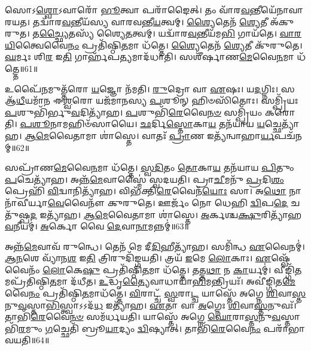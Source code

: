 𑌸𑍋𑌽\-\ul{𑌶𑍍𑌵𑍋}\-\-𑌽𑌵𑌾𑌰𑍋᳴ \ul{𑌭𑍂}\-𑌤𑍍𑌵𑌾 𑌪𑌰𑌾᳴𑌙𑍈𑌤𑍍।
𑌤𑌂 𑌵𑌾᳴𑌰\-\ul{𑌵}\-𑌨𑍍𑌤𑍀𑌯𑍇᳴𑌨𑌾𑌵𑌾𑌰𑌯𑌤।
𑌤𑌦𑍍𑌵𑌾᳴𑌰\-\ul{𑌵}\-𑌨𑍍𑌤𑍀𑌯᳴𑌸𑍍𑌯 𑌵𑌾𑌰𑌵𑌨𑍍𑌤𑍀\-\ul{𑌯}\-𑌤𑍍𑌵𑌮𑍍।
\-\ul{𑌶𑍍𑌯𑍈}\-𑌤𑍇𑌨᳴ \ul{𑌶𑍍𑌯𑍇}\-𑌤𑍀 𑌅᳴𑌕𑍁𑌰𑍁𑌤।
𑌤\-\ul{𑌚𑍍𑌛𑍍𑌯𑍈}\-𑌤𑌸𑍍𑌯᳴ 𑌶𑍍𑌯𑍈\-\ul{𑌤}\-𑌤𑍍𑌵𑌮𑍍।
𑌯𑌦𑍍𑌵𑌾᳴𑌰\-\ul{𑌵}\-𑌨𑍍𑌤𑍀𑌯᳴𑌮\-\ul{𑌭𑌿} 𑌗𑌾𑌯᳴𑌤𑍇।
\-\ul{𑌵𑌾}\-\-\ul{𑌰}\-\-\ul{𑌯𑌿}\-𑌤𑍍𑌵𑍈𑌵𑍈\-\ul{𑌨𑌂} 𑌪𑍍𑌰𑌤𑌿᳴\-𑌷𑍍𑌠𑌿\-\ul{𑌤}\-𑌮𑌾 𑌧᳴𑌤𑍍𑌤𑍇।
\-\ul{𑌶𑍍𑌯𑍈}\-𑌤𑍇𑌨᳴ \ul{𑌶𑍍𑌯𑍇}\-𑌤𑍀 𑌕𑍁᳴𑌰𑍁𑌤𑍇।
\-\ul{𑌘}\-𑌰𑍍𑌮𑌃 𑌶𑌿\-\ul{𑌰} 𑌇\-\ul{𑌤𑌿} 𑌗𑌾𑌰𑍍\mbox{}𑌹᳴𑌪\-\ul{𑌤𑍍𑌯}\-𑌮𑌾𑌦᳴𑌧𑌾𑌤𑌿।
𑌸𑌶𑍀᳴𑌰𑍍\mbox{}𑌷𑌾𑌣\-\ul{𑌮𑍇}\-𑌵𑍈\-\ul{𑌨}\-𑌮𑌾 𑌧᳴𑌤𑍍𑌤𑍇॥61॥

𑌉𑌪𑍈᳴\-\ul{𑌨}\-𑌮𑍁𑌤𑍍𑌤᳴𑌰𑍋 \ul{𑌯}\-𑌜𑍍𑌞𑍋 𑌨᳴𑌮𑌤𑌿।
\-\ul{𑌰𑍁}\-𑌦𑍍𑌰𑍋 𑌵𑌾 \ul{𑌏}\-𑌷𑌃।
𑌯\-\ul{𑌦}\-𑌗𑍍𑌨𑌿𑌃।
𑌸 𑌆᳴\-\ul{𑌧𑍀}\-𑌯𑌮𑌾᳴𑌨 𑌈\-\ul{𑌶𑍍𑌵}\-𑌰𑍋 𑌯𑌜᳴𑌮𑌾𑌨𑌸𑍍𑌯 \ul{𑌪}\-𑌶𑍂𑌨𑍍 𑌹𑌿𑍞𑌸𑌿᳴𑌤𑍋𑌃।
𑌸𑌮𑍍𑌪𑍍𑌰𑌿᳴𑌯𑌃 \ul{𑌪}\-𑌶𑍁𑌭𑌿᳴𑌰𑍍𑌭𑍁\-\ul{𑌵}\-𑌦𑌿𑌤𑍍𑌯𑌾᳴𑌹।
\-\ul{𑌪}\-𑌶𑍁𑌭𑌿᳴\-\ul{𑌰𑍇}\-𑌵𑍈\-\ul{𑌨}\-\-\ul{𑍞} 𑌸𑌮𑍍𑌪𑍍𑌰𑌿᳴𑌯𑌂 𑌕𑌰𑍋𑌤𑌿।
\-\ul{𑌪}\-\-\ul{𑌶𑍂}\-𑌨𑌾𑌮𑌹𑌿𑍞᳴𑌸𑌾𑌯𑍈।
\-\ul{𑌛}\-𑌰𑍍𑌦𑌿\-\ul{𑌸𑍍𑌤𑍋}\-𑌕𑌾\-\ul{𑌯} 𑌤𑌨᳴𑌯𑌾𑌯 \ul{𑌯}\-𑌚𑍍𑌛𑍇𑌤𑍍𑌯𑌾᳴𑌹।
\-\ul{𑌆}\-\-\-\ul{𑌮𑍇}\-𑌵𑍈𑌤𑌾𑌮𑌾 𑌶𑌾॑𑌸𑍍𑌤𑍇।
𑌵𑌾𑌤𑌃᳴ \ul{𑌪𑍍𑌰𑌾}\-𑌣 𑌇𑌤𑍍𑌯᳴𑌨𑍍𑌵𑌾𑌹𑌾\-\ul{𑌰𑍍𑌯}\-𑌪𑌚᳴𑌨𑌮𑍍॥62॥

𑌸𑌪𑍍𑌰𑌾᳴𑌣\-\ul{𑌮𑍇}\-𑌵𑍈\-\ul{𑌨}\-𑌮𑌾 𑌧᳴𑌤𑍍𑌤𑍇।
\-\ul{𑌸𑍍𑌵}\-\-\ul{𑌦𑌿}\-𑌤𑌂 \ul{𑌤𑍋}\-𑌕𑌾\-\ul{𑌯} 𑌤𑌨᳴𑌯𑌾𑌯 \ul{𑌪𑌿}\-𑌤𑍁𑌂 \ul{𑌪}\-𑌚𑍇𑌤𑍍𑌯𑌾᳴𑌹।
𑌅𑌨𑍍𑌨᳴\-\ul{𑌮𑍇}\-𑌵𑌾𑌸𑍍𑌮𑍈॑ 𑌸𑍍𑌵𑌦𑌯𑌤𑌿।
𑌪𑍍𑌰𑌾\-\ul{𑌚𑍀}\-𑌮𑌨𑍁᳴ \ul{𑌪𑍍𑌰}\-𑌦𑌿\-\ul{𑌶𑌂} 𑌪𑍍𑌰𑍇𑌹𑌿᳴ \ul{𑌵𑌿}\-𑌦𑍍𑌵𑌾𑌨𑌿𑌤𑍍𑌯𑌾᳴𑌹।
𑌵𑌿𑌭᳴𑌕𑍍𑌤𑌿\-\ul{𑌰𑍇}\-𑌵𑍈𑌨᳴\-\ul{𑌯𑍋𑌃} 𑌸𑌾।
𑌅\-\ul{𑌥𑍋} 𑌨𑌾𑌨𑌾᳴𑌵𑍀𑌰𑍍𑌯𑌾\-\ul{𑌵𑍇}\-𑌵𑍈𑌨𑍗᳴ 𑌕𑍁𑌰𑍁𑌤𑍇।
𑌊𑌰𑍍𑌜𑌂᳴ 𑌨𑍋 𑌧𑍇𑌹𑌿 \ul{𑌦𑍍𑌵𑌿}\-𑌪\-\ul{𑌦𑍇} 𑌚𑌤𑍁᳴𑌷𑍍𑌪\-\ul{𑌦} 𑌇𑌤𑍍𑌯𑌾᳴𑌹।
\-\ul{𑌆}\-\-\-\ul{𑌮𑍇}\-𑌵𑍈𑌤𑌾𑌮𑌾 𑌶𑌾॑𑌸𑍍𑌤𑍇।
\-\ul{𑌅}\-𑌰𑍍𑌕𑌶𑍍𑌚\-\ul{𑌕𑍍𑌷𑍁}\-𑌰𑌿𑌤𑍍𑌯𑌾᳴𑌹\-\ul{𑌵}\-𑌨𑍀𑌯𑌮𑍍॑।
\-\ul{𑌅}\-𑌰𑍍𑌕𑍋 𑌵𑍈 \ul{𑌦𑍇}\-𑌵𑌾\-\ul{𑌨𑌾}\-𑌮𑌨𑍍𑌨𑌮𑍍॑॥63॥

𑌅𑌨𑍍𑌨᳴\-\ul{𑌮𑍇}\-𑌵𑌾𑌵᳴ 𑌰𑍁𑌨𑍍𑌧𑍇।
𑌤𑍇𑌨᳴ 𑌮𑍇 𑌦𑍀\-\ul{𑌦𑌿}\-𑌹𑍀𑌤𑍍𑌯𑌾᳴𑌹।
𑌸𑌮𑌿᳴𑌨𑍍𑌧 \ul{𑌏}\-𑌵𑍈𑌨𑌮𑍍॑।
\-\ul{𑌆}\-\-\ul{𑌨}\-𑌶𑍇 𑌵𑍍𑌯𑌾᳴𑌨\-\ul{𑌶} 𑌇\-\ul{𑌤𑌿} 𑌤𑍍𑌰𑌿𑌰𑍁𑌦𑌿᳴𑌙𑍍𑌗𑌯𑌤𑌿।
𑌤𑍍𑌰𑌯᳴ \ul{𑌇}\-𑌮𑍇 \ul{𑌲𑍋}\-𑌕𑌾𑌃।
\-\ul{𑌏}\-𑌷𑍍𑌵𑍇᳴𑌵𑍈𑌨𑌂᳴ \ul{𑌲𑍋}\-𑌕𑍇\-\ul{𑌷𑍁} 𑌪𑍍𑌰𑌤𑌿᳴\-𑌷𑍍𑌠𑌿\-\ul{𑌤}\-𑌮𑌾 𑌧᳴𑌤𑍍𑌤𑍇।
𑌤𑌤𑍍𑌤\-\ul{𑌥𑌾} 𑌨 \ul{𑌕𑌾}\-𑌰𑍍𑌯𑌮𑍍॑।
𑌵𑍀𑌙𑍍𑌗𑌿᳴\-\ul{𑌤}\-𑌮𑌪𑍍𑌰᳴𑌤𑌿𑌷𑍍𑌠𑌿\-\ul{𑌤}\-𑌮𑌾 𑌦᳴𑌧𑍀𑌤।
\-\ul{𑌉}\-𑌦𑍍𑌧𑍃\-\ul{𑌤𑍍𑌯𑍈}\-𑌵𑌾𑌧𑌾𑌯𑌾᳴\-\ul{𑌭𑌿}\-𑌮𑌨𑍍𑌤𑍍𑌰𑌿𑌯𑌃᳴।
𑌅𑌵𑍀॑𑌙𑍍𑌗𑌿𑌤\-\ul{𑌮𑍇}\-𑌵𑍈\-\ul{𑌨𑌂} 𑌪𑍍𑌰𑌤𑌿᳴\-𑌷𑍍𑌠𑌿\-\ul{𑌤}\-𑌮𑌾𑌧᳴𑌤𑍍𑌤𑍇।
\-\ul{𑌵𑌿}\-𑌰𑌾𑌟𑍍𑌚᳴ \ul{𑌸𑍍𑌵}\-𑌰𑌾\-\ul{𑌟𑍍𑌚} 𑌯𑌾𑌸𑍍𑌤𑍇᳴ 𑌅𑌗𑍍𑌨𑍇 \ul{𑌶𑌿}\-𑌵𑌾\-\ul{𑌸𑍍𑌤}\-𑌨𑍁\-\ul{𑌵}\-𑌸𑍍𑌤𑌾\-\ul{𑌭𑌿}\-𑌸𑍍𑌤𑍍𑌵𑌾\-𑌽𑌽𑌦᳴\-\ul{𑌧} 𑌇𑌤𑍍𑌯𑌾᳴𑌹।
\-\ul{𑌏}\-𑌤𑌾 𑌵𑌾 \ul{𑌅}\-𑌗𑍍𑌨𑍇𑌃 \ul{𑌶𑌿}\-𑌵𑌾\-\ul{𑌸𑍍𑌤}\-𑌨𑍁𑌵𑌃᳴।
𑌤𑌾𑌭𑌿᳴\-\ul{𑌰𑍇}\-𑌵𑍈\-\ul{𑌨}\-\-\ul{𑍞} 𑌸𑌮᳴𑌰𑍍𑌧𑌯𑌤𑌿।
𑌯𑌾𑌸𑍍𑌤𑍇᳴ 𑌅𑌗𑍍𑌨𑍇 \ul{𑌘𑍋}\-𑌰𑌾\-\ul{𑌸𑍍𑌤}\-𑌨𑍁\-\ul{𑌵}\-𑌸𑍍𑌤𑌾𑌭𑌿᳴\-\ul{𑌰}\-𑌮𑍁𑌂 \ul{𑌗}\-𑌚𑍍𑌛𑍇𑌤𑌿᳴ 𑌬𑍍𑌰𑍂\-\ul{𑌯𑌾}\-𑌦𑍍𑌯𑌂 \ul{𑌦𑍍𑌵𑌿}\-𑌷𑍍𑌯𑌾𑌤𑍍।
𑌤𑌾𑌭𑌿᳴\-\ul{𑌰𑍇}\-𑌵𑍈\-\ul{𑌨𑌂} 𑌪𑌰𑌾᳴𑌭𑌾𑌵𑌯𑌤𑌿॥64॥\anuvakamend[\-\ul{𑌲𑍋}\-𑌕𑍋᳴\-𑌽\-𑌸𑍃𑌜𑌤𑍈\-\ul{𑌨}\-𑌮𑌾𑌧᳴𑌤𑍍𑌤𑍇\-𑌽𑌨𑍍𑌵𑌾𑌹𑌾\-\ul{𑌰𑍍𑌯}\-𑌪𑌚᳴𑌨𑌂 \ul{𑌦𑍇}\-𑌵𑌾\-\ul{𑌨𑌾}\-𑌮𑌨𑍍𑌨᳴𑌮𑍇\-\ul{𑌨𑌂} 𑌪𑍍𑌰𑌤𑌿᳴\-𑌷𑍍𑌠𑌿\-\ul{𑌤}\-𑌮𑌾𑌧᳴\-\ul{𑌤𑍍𑌤𑍇} 𑌪𑌞𑍍𑌚᳴ 𑌚]

